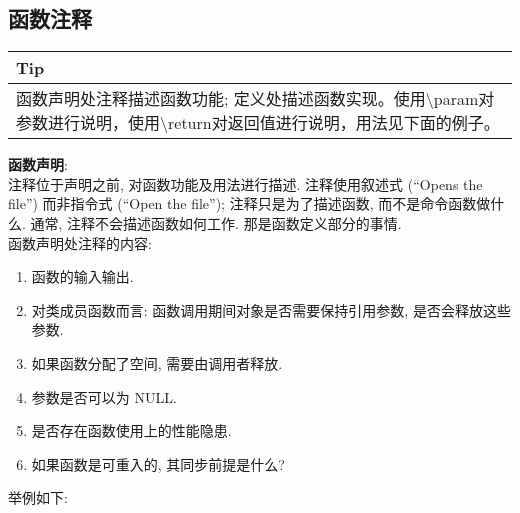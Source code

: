 \documentclass[a4paper,11pt,CJK]{article}
\begin{document}
\begin{CJK}{UTF8}{gbsn}
\subsection{函数注释}
\begin{table}[htbp]
\flushleft
\begin{tabular}{p{400pt}}
\toprule
\rowcolor[gray]{.8} Tip \\
\midrule
函数声明处注释描述函数功能; 定义处描述函数实现。使用\textbackslash{}param对参数进行说明，使用\textbackslash{}return对返回值进行说明，用法见下面的例子。
\\
\bottomrule
\end{tabular}
\end{table}
\noindent
\textbf{函数声明}:\\
\indent 注释位于声明之前, 对函数功能及用法进行描述. 注释使用叙述式 (``Opens the file'') 而非指令式 (``Open the file''); 注释只是为了描述函数, 而不是命令函数做什么. 通常, 注释不会描述函数如何工作. 那是函数定义部分的事情.\\
函数声明处注释的内容:
\begin{enumerate}
\item
函数的输入输出.
\item
对类成员函数而言: 函数调用期间对象是否需要保持引用参数, 是否会释放这些参数.
\item
如果函数分配了空间, 需要由调用者释放.
\item
参数是否可以为 NULL.
\item
是否存在函数使用上的性能隐患.
\item
如果函数是可重入的, 其同步前提是什么?
\end{enumerate}
举例如下:\\
\\
\end{CJK}
\end{document}
